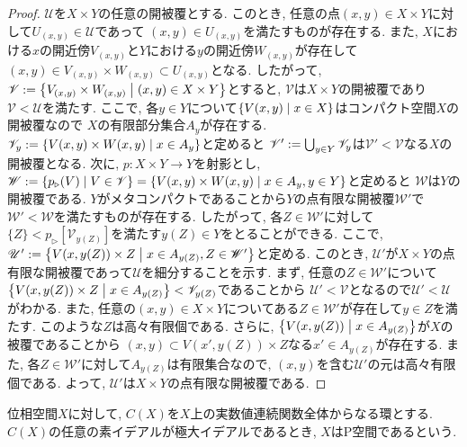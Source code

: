 \documentclass[uplatex, dvipdfmx, a4paper, 12pt, class=jsbook, crop=false]{standalone}
\newcommand{\imgto}{{}\triangleright{}}
\begin{document}
\begin{proof}
	$ \mathscr{U} $を$ X \times Y $の任意の開被覆とする. 
	このとき, 任意の点$ (x, y) \in X \times Y $に対して$ U_{(x, y)} \in \mathscr{U} $であって
	$ (x, y) \in U_{(x, y)} $を満たすものが存在する. 
	また, $ X $における$ x $の開近傍$ V_{(x, y)} $と$ Y $における$ y $の開近傍$ W_{(x, y)} $が存在して
	$ (x, y) \in V_{(x,y)} \times W_{(x, y)} \subset U_{(x, y)} $となる. 
	したがって, $ \mathscr{V} \defeq \setcomp{V_{(x, y)} \times W_{(x, y)}}{(x, y) \in X \times Y} $とすると, 
	$ \mathscr{V} $は$ X \times Y $の開被覆であり$ \mathscr{V} < \mathscr{U} $を満たす. 
	ここで, 各$ y \in Y $について$ \setcomp{V(x, y)}{x \in X} $はコンパクト空間$ X $の開被覆なので
	$ X $の有限部分集合$ A_y $が存在する. 
	$ \mathscr{V}_y \defeq \setcomp{V(x, y) \times W(x, y)}{x \in A_y} $と定めると
	$ \mathscr{V}' \mathrel{:=} \bigcup_{y \in Y}\mathscr{V}_y $は$ \mathscr{V}' < \mathscr{V} $なる$ X $の開被覆となる. 
	次に, $ p \colon X \times Y \to Y $を射影とし, 
	$ \mathscr{W} \defeq \setcomp{p_{\imgto}(V)}{V \in \mathscr{V}} = \setcomp{V(x, y) \times W(x, y)}{x \in A_y, y \in Y} $と定めると
	$ \mathscr{W} $は$ Y $の開被覆である. 
	$ Y $がメタコンパクトであることから$ Y $の点有限な開被覆$ \mathscr{W}' $で$ \mathscr{W}' < \mathscr{W} $を満たすものが存在する. 
	したがって, 各$ Z \in \mathscr{W}' $に対して
	$ \{Z\} <  p_{\imgto}[\mathscr{V}_{y(Z)}] $を満たす$ y(Z) \in Y $をとることができる. 
	ここで, $ \mathscr{U}' \defeq  \setcomp{V(x, y(Z)) \times Z}{x \in A_{y(Z)}, Z \in \mathscr{W}'} $と定める. 
	このとき, $ \mathscr{U}' $が$ X \times Y $の点有限な開被覆であって$ \mathscr{U} $を細分することを示す. 
	まず, 任意の$ Z \in \mathscr{W}' $について
	$ \setcomp{V(x, y(Z)) \times Z}{x \in A_{y(Z)}} < \mathscr{V}_{y(Z)} $であることから
	$ \mathscr{U}' < \mathscr{V} $となるので$ \mathscr{U}' < \mathscr{U} $がわかる. 
	また, 任意の$ (x, y) \in X \times Y $についてある$ Z \in \mathscr{W}' $が存在して$ y \in Z $を満たす. 
	このような$ Z $は高々有限個である. 
	さらに, $ \setcomp{V(x, y(Z))}{x \in A_{y(Z)}} $が$ X $の被覆であることから
	$ (x, y) \subset V(x', y(Z)) \times Z $なる$ x' \in A_{y(Z)} $が存在する. 
	また, 各$ Z \in \mathscr{W}' $に対して$ A_{y(Z)} $は有限集合なので, 
	$ (x, y) $を含む$ \mathscr{U}' $の元は高々有限個である. 
	よって, $ \mathscr{U}' $は$ X \times Y $の点有限な開被覆である.  
\end{proof}

\begin{definition}
	位相空間$ X $に対して, $ C(X) $を$ X $上の実数値連続関数全体からなる環とする. 
	$ C(X) $の任意の素イデアルが極大イデアルであるとき, $ X $はP空間であるという.
\end{definition}
\end{document}
